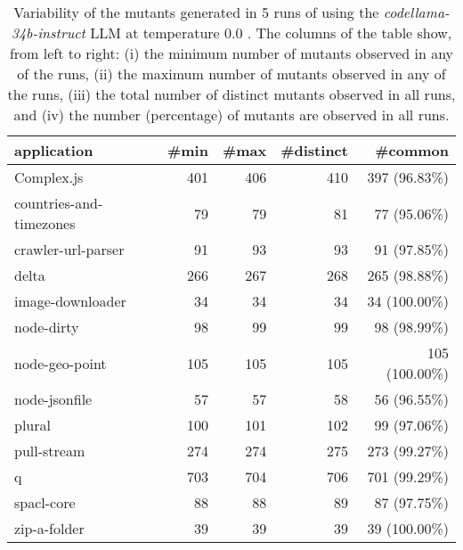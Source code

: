 
\begin{table}[hbt!]
\centering
{\footnotesize
\begin{tabular}{l|r|r|r|r}

{\bf application}  & {\bf \#min} &  {\bf \#max} &  {\bf \#distinct} & {\bf \#common}\\
\hline
Complex.js & 401 & 406 & 410 & 397 (96.83\%) \\ 
countries-and-timezones & 79 & 79 & 81 & 77 (95.06\%) \\ 
crawler-url-parser & 91 & 93 & 93 & 91 (97.85\%) \\ 
delta & 266 & 267 & 268 & 265 (98.88\%) \\ 
image-downloader & 34 & 34 & 34 & 34 (100.00\%) \\ 
node-dirty & 98 & 99 & 99 & 98 (98.99\%) \\ 
node-geo-point & 105 & 105 & 105 & 105 (100.00\%) \\ 
node-jsonfile & 57 & 57 & 58 & 56 (96.55\%) \\ 
plural & 100 & 101 & 102 & 99 (97.06\%) \\ 
pull-stream & 274 & 274 & 275 & 273 (99.27\%) \\ 
q & 703 & 704 & 706 & 701 (99.29\%) \\ 
spacl-core & 88 & 88 & 89 & 87 (97.75\%) \\ 
zip-a-folder & 39 & 39 & 39 & 39 (100.00\%) \\ 
\end{tabular}
}
\caption{
  Variability of the mutants generated in 5 runs of \ToolName using the \textit{codellama-34b-instruct} LLM
       at temperature 0.0 . The columns of the table show, from left to right:
    (i) the minimum number of mutants observed in any of the runs,
    (ii) the maximum number of mutants observed in any of the runs,
    (iii) the total number of distinct mutants observed in all runs, and
    (iv) the number (percentage) of mutants are observed in all runs.
}
\label{table:Variability_codellama-34b-instruct_0.0}
\end{table}